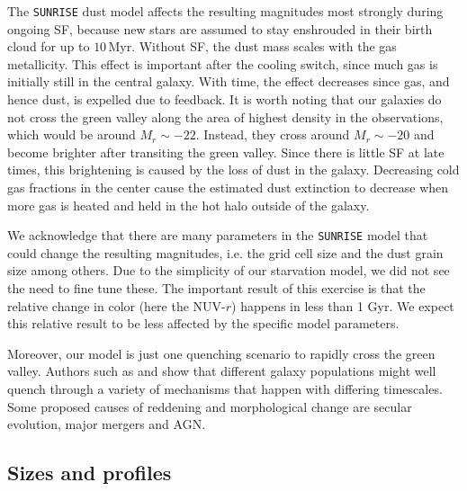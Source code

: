 \documentclass[useAMS,usenatbib]{mnras}
\begin{document}
{The \texttt{SUNRISE} dust model affects the resulting magnitudes
  most strongly during ongoing SF, because new stars are assumed to
  stay enshrouded in their birth cloud for up to $10$\,Myr. Without SF,
the dust mass scales with the gas metallicity. This effect is
important after the cooling switch, since much gas is initially still
in the central galaxy. With time, the effect decreases since gas, and
hence dust, is expelled due to feedback.}
It is worth noting that our galaxies do not cross the green valley
along the area of highest density in the observations, which would be
around $M_r\sim-22$. Instead, they cross around $M_r\sim-20$ and become
brighter after transiting the green valley. Since there is little SF
at late times, this brightening is caused by the loss of dust in the
galaxy. Decreasing cold gas fractions in the center cause the estimated
dust extinction to decrease when more gas is heated and held in the
hot halo outside of the galaxy.

{We acknowledge that there are many parameters in the
  \texttt{SUNRISE} model that could change the resulting
  magnitudes, i.e. the grid cell size and the dust grain size among others. Due to the simplicity of our starvation model, we did
  not see the need to fine tune these. The important result of this
  exercise is that the relative change in color (here the
  NUV-$r$) happens in less than 1 Gyr. We expect this relative result
  to be less affected by the specific model parameters. 

Moreover, our model is just one quenching scenario to rapidly cross
the green valley. Authors such as \citet{Smethurst2015} and \citet{Trayford2016}
show that different galaxy populations might well quench through a
variety of mechanisms that happen with differing timescales. Some
proposed causes of
reddening and morphological change are secular evolution, major
mergers and AGN.}

\subsection{Sizes and profiles}
\label{sec:rm}
\end{document}
